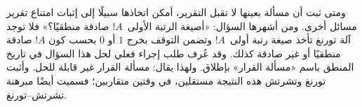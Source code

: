 \documentclass[../../../include/open-logic-section]{subfiles}
\begin{document}
ومتى ثبت أن مسألة بعينها لا تقبل التقرير، أمكن اتخاذها سبيلًا إلى
إثبات امتناع تقرير مسائل أخرى. ومن أشهرها السؤال:
«أصيغة الرتبة الأولى~$!A$ صادقة منطقيًا؟» فلا توجد آلة تورنغ تأخذ
صيغة رتبة أولى~$!A$ وتضمن التوقف بخرج $1$ أو $0$ بحسب كون
$!A$ صادقة منطقيًا أو غير صادقة كذلك. وقد عُرف طلب إجراء فعلي لحل
هذا السؤال في تاريخ المنطق باسم «مسألة القرار» بإطلاق. ولهذا يقال:
مسألة القرار غير قابلة للحل. وأثبت تورنغ وتشرتش هذه النتيجة
مستقلين، في وقتين متقاربين؛ فسميت أيضًا مبرهنة تشرتش--تورنغ.
\end{document}

